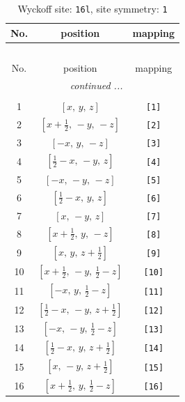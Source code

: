 \documentclass[fleqn,8pt]{jsarticle}
\begin{document}
\begin{longtable}{ccc}
\caption{Wyckoff site: {\tt 16l}, site symmetry: {\tt 1}}
 \\
 \hline \hline
No. & position & mapping \\ \hline \endfirsthead

\multicolumn{2}{l}{\tablename\ \thetable{}} \\
 \hline \hline
No. & position & mapping \\ \hline \endhead

 \hline \hline
\multicolumn{2}{r}{\footnotesize\it continued ...} \\ \endfoot

 \hline \hline
\multicolumn{2}{r}{} \\ \endlastfoot

1 & $\left[ x,\, y,\, z \right]$ & {\tt [1]} \\ \hline
2 & $\left[ x + \frac{1}{2},\, - y,\, - z \right]$ & {\tt [2]} \\ \hline
3 & $\left[ - x,\, y,\, - z \right]$ & {\tt [3]} \\ \hline
4 & $\left[ \frac{1}{2} - x,\, - y,\, z \right]$ & {\tt [4]} \\ \hline
5 & $\left[ - x,\, - y,\, - z \right]$ & {\tt [5]} \\ \hline
6 & $\left[ \frac{1}{2} - x,\, y,\, z \right]$ & {\tt [6]} \\ \hline
7 & $\left[ x,\, - y,\, z \right]$ & {\tt [7]} \\ \hline
8 & $\left[ x + \frac{1}{2},\, y,\, - z \right]$ & {\tt [8]} \\ \hline
9 & $\left[ x,\, y,\, z + \frac{1}{2} \right]$ & {\tt [9]} \\ \hline
10 & $\left[ x + \frac{1}{2},\, - y,\, \frac{1}{2} - z \right]$ & {\tt [10]} \\ \hline
11 & $\left[ - x,\, y,\, \frac{1}{2} - z \right]$ & {\tt [11]} \\ \hline
12 & $\left[ \frac{1}{2} - x,\, - y,\, z + \frac{1}{2} \right]$ & {\tt [12]} \\ \hline
13 & $\left[ - x,\, - y,\, \frac{1}{2} - z \right]$ & {\tt [13]} \\ \hline
14 & $\left[ \frac{1}{2} - x,\, y,\, z + \frac{1}{2} \right]$ & {\tt [14]} \\ \hline
15 & $\left[ x,\, - y,\, z + \frac{1}{2} \right]$ & {\tt [15]} \\ \hline
16 & $\left[ x + \frac{1}{2},\, y,\, \frac{1}{2} - z \right]$ & {\tt [16]} \\
\end{longtable}
\end{document}
